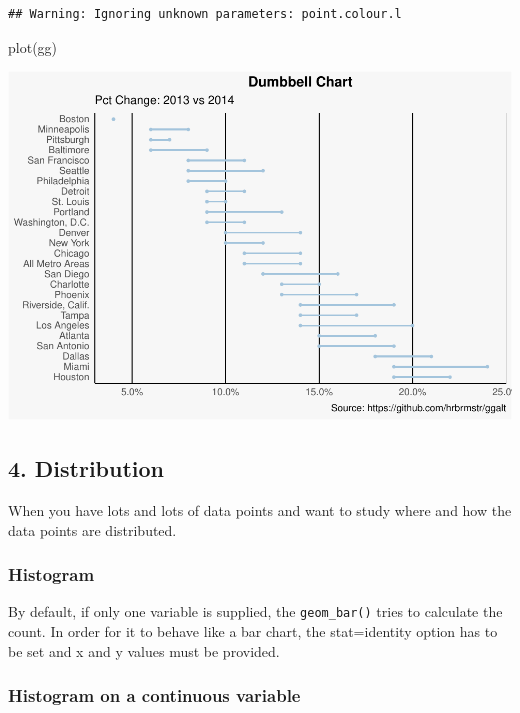 \documentclass[a4paper]{article}
\newenvironment{Shaded}{}{}
\newcommand{\KeywordTok}[1]{\textcolor[rgb]{0.00,0.00,1.00}{#1}}
\newcommand{\NormalTok}[1]{#1}
\begin{document}
\begin{verbatim}
## Warning: Ignoring unknown parameters: point.colour.l
\end{verbatim}

\begin{Shaded}
\begin{Highlighting}[]
\KeywordTok{plot}\NormalTok{(gg)}
\end{Highlighting}
\end{Shaded}

\includegraphics{M24-ggplot2_Gallery_files/figure-latex/unnamed-chunk-21-1.pdf}

\newpage

\subsection{4. Distribution}\label{distribution}

When you have lots and lots of data points and want to study where and
how the data points are distributed.

\subsubsection{Histogram}\label{histogram}

By default, if only one variable is supplied, the \texttt{geom\_bar()}
tries to calculate the count. In order for it to behave like a bar
chart, the stat=identity option has to be set and x and y values must be
provided.

\subsubsection{Histogram on a continuous
variable}\label{histogram-on-a-continuous-variable}
\end{document}
